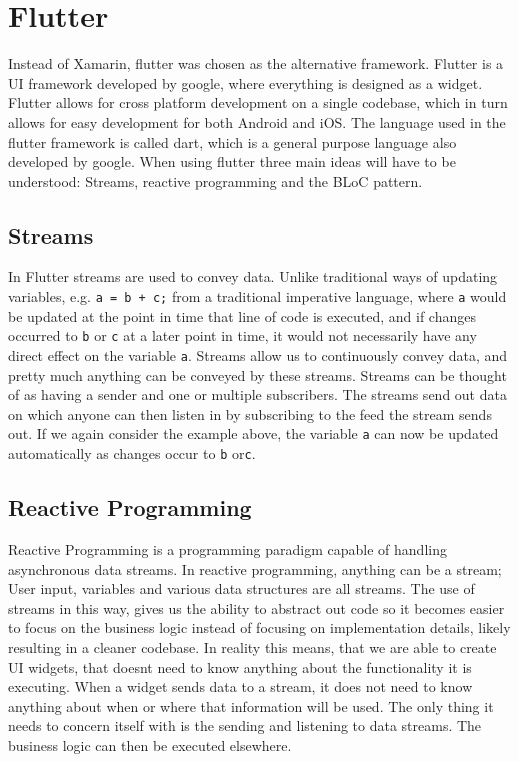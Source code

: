 \section{Flutter}
Instead of Xamarin, flutter was chosen as the alternative framework.
Flutter is a UI framework developed by google, where everything is designed as a widget.
Flutter allows for cross platform development on a single codebase, which in turn allows for easy development for both Android and iOS.
The language used in the flutter framework is called dart, which is a general purpose language also developed by google.
When using flutter three main ideas will have to be understood:
Streams, reactive programming and the BLoC pattern.

\subsection{Streams}
In Flutter streams are used to convey data.
Unlike traditional ways of updating variables, e.g. \lstinline{a = b + c;} from a traditional imperative language, where \lstinline{a} would be updated at the point in time that line of code is executed, and if changes occurred to \lstinline{b} or \lstinline{c} at a later point in time, it would not necessarily have any direct effect on the variable \lstinline{a}.
Streams allow us to continuously convey data, and pretty much anything can be conveyed by these streams.
Streams can be thought of as having a sender and one or multiple subscribers.
The streams send out data on which anyone can then listen in by subscribing to the feed the stream sends out.
If we again consider the example above, the variable \lstinline{a} can now be updated automatically as changes occur to \lstinline{b} or\lstinline{c}.
\subsection{Reactive Programming}
Reactive Programming is a programming paradigm capable of handling asynchronous data streams. 
In reactive programming, anything can be a stream; User input, variables and various data structures are all streams. The use of streams in this way, gives us the ability to abstract out code so it becomes easier to focus on the business logic instead of focusing on implementation details, likely resulting in a cleaner codebase.
In reality this means, that we are able to create UI widgets, that doesnt need to know anything about the functionality it is executing. 
When a widget sends data to a stream, it does not need to know anything about when or where that information will be used. The only thing it needs to concern itself with is the sending and listening to data streams. The business logic can then be executed elsewhere. 
